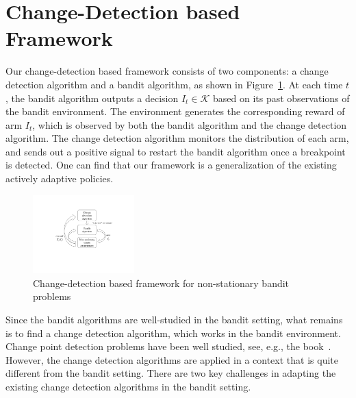 \documentclass[letterpaper]{article} %
\begin{document}
\section{Change-Detection based Framework}\label{sec:framework}
Our change-detection based framework consists of two components: a change detection algorithm and a bandit algorithm, as shown in Figure~\ref{fig:framework}. At each time $t$, the bandit algorithm outputs a decision $I_t\in\mathcal{K}$ based on its past observations of the bandit environment. The environment generates the corresponding reward of arm $I_t$, which is observed by both the bandit algorithm and the change detection algorithm. The change detection algorithm monitors the distribution of each arm, and sends out a positive signal to restart the bandit algorithm once a breakpoint is detected. One can find that our framework is a generalization of the existing actively adaptive policies. 
\begin{figure}
  \centering
    \includegraphics[width=0.35\textwidth]{Slide1} %
     \caption{Change-detection based framework for non-stationary bandit problems}
     \label{fig:framework}
\end{figure}


Since the bandit algorithms are well-studied in the bandit setting, what remains is to find a change detection algorithm, which works in the bandit environment. Change point detection problems have been well studied, see, e.g., the book~\cite{basseville1993detection}. However, the change detection algorithms are applied in a context that is quite different from the bandit setting. There are two key challenges in adapting the existing change detection algorithms in the bandit setting.
\end{document}

